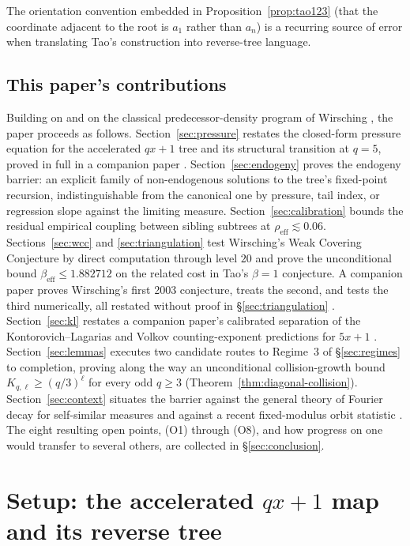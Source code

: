 \documentclass[11pt]{article}
\theoremstyle{definition}
\theoremstyle{remark}
\begin{document}
The orientation convention embedded in Proposition~\ref{prop:tao123}
(that the coordinate adjacent to the root is $a_1$ rather than $a_n$)
is a
recurring source of error when translating Tao's construction into
reverse-tree language.

\subsection{This paper's contributions}

Building on \cite{Tao2022} and on the classical predecessor-density
program of Wirsching \cite{Wirsching1998,Wirsching2003}, the paper
proceeds as follows. Section~\ref{sec:pressure} restates the closed-form
pressure equation for the accelerated $qx+1$ tree and its structural
transition at $q=5$, proved in full in a companion paper
\cite{PressureCompanion}. Section~\ref{sec:endogeny} proves the
endogeny barrier: an explicit family of non-endogenous solutions to the
tree's fixed-point recursion, indistinguishable from the canonical one
by pressure, tail index, or regression slope against the limiting
measure. Section~\ref{sec:calibration} bounds the residual empirical
coupling between sibling subtrees at $\rho_{\mathrm{eff}}\lesssim0.06$.
Sections~\ref{sec:wcc} and \ref{sec:triangulation} test Wirsching's
Weak Covering Conjecture by direct computation through level $20$ and
prove the unconditional bound $\beta_{\mathrm{eff}}\le1.882712$ on the
related cost in Tao's $\beta=1$ conjecture. A companion paper proves
Wirsching's first 2003 conjecture, treats the second, and tests the
third numerically, all restated without proof in
\S\ref{sec:triangulation} \cite{WirschingCompanion}. Section~\ref{sec:kl} restates a companion
paper's calibrated separation of the Kontorovich--Lagarias and Volkov
counting-exponent predictions for $5x+1$ \cite{KLVolkovCompanion}.
Section~\ref{sec:lemmas} executes two candidate routes to Regime~3 of
\S\ref{sec:regimes} to completion, proving along the way an
unconditional collision-growth bound
$K_{q,\ell}\ge(q/3)^\ell$ for every odd $q\ge3$
(Theorem~\ref{thm:diagonal-collision}). Section~\ref{sec:context}
situates the barrier against the general theory of Fourier decay for
self-similar measures and against a recent fixed-modulus orbit
statistic \cite{Chang2026}. The eight resulting open points, (O1)
through (O8), and how progress on one would transfer to several others,
are collected in \S\ref{sec:conclusion}.

\section{Setup: the accelerated $qx+1$ map and its reverse tree}
\label{sec:setup}
\end{document}
